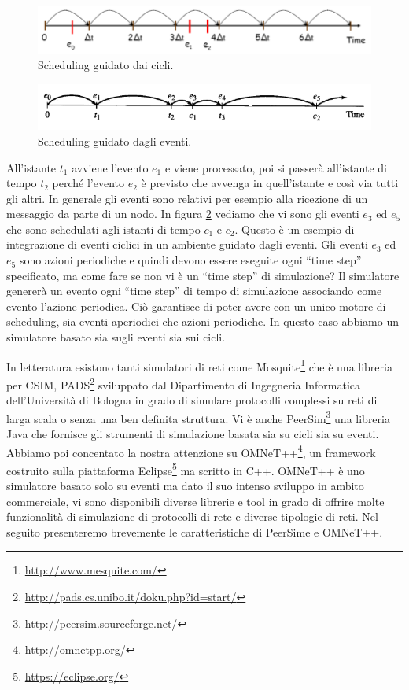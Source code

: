 \begin{figure}[t]
	\centering
	\includegraphics[width=0.9\linewidth, keepaspectratio]{Images/simulatori/cycled_driven_01}
	\caption[Cycle driven scheduling]{Scheduling guidato dai cicli.}
	\label{fig:cycled_driven_01}
\end{figure}

\begin{figure}[t]
	\centering
	\includegraphics[width=0.9\linewidth, keepaspectratio]{Images/simulatori/event_driven_01}
	\caption[Event driven scheduling]{Scheduling guidato dagli eventi.}
	\label{fig:event_driven_01}
\end{figure}

All'istante $t_1$ avviene l'evento $e_1$ e viene processato, poi si passerà all'istante di tempo $t_2$ perché l'evento $e_2$ è previsto che avvenga in quell'istante e così via tutti gli altri. In generale gli eventi sono relativi per esempio alla ricezione di un messaggio da parte di un nodo. In figura \ref{fig:event_driven_01} vediamo che vi sono gli eventi $e_3$ ed $e_5$ che sono schedulati agli istanti di tempo $c_1$ e $c_2$. Questo è un esempio di integrazione di eventi ciclici in un ambiente guidato dagli eventi. Gli eventi $e_3$ ed $e_5$ sono azioni periodiche e quindi devono essere eseguite ogni “time step” specificato, ma come fare se non vi è un “time step” di simulazione? Il simulatore genererà un evento ogni “time step” di tempo di simulazione associando come evento l'azione periodica. Ciò garantisce di poter avere con un unico motore di scheduling, sia eventi aperiodici che azioni periodiche. In questo caso abbiamo un simulatore basato sia sugli eventi sia sui cicli.

In letteratura esistono tanti simulatori di reti come Mosquite\footnote{\url{http://www.mesquite.com/}} che è una libreria per CSIM, PADS\footnote{\url{http://pads.cs.unibo.it/doku.php?id=start/}} sviluppato dal Dipartimento di Ingegneria Informatica dell'Università di Bologna in grado di simulare protocolli complessi su reti di larga scala o senza una ben definita struttura. Vi è anche PeerSim\footnote{\url{http://peersim.sourceforge.net/}} una libreria Java che fornisce gli strumenti di simulazione basata sia su cicli sia su eventi. Abbiamo poi concentato la nostra attenzione su OMNeT++\footnote{\url{http://omnetpp.org/}}, un framework costruito sulla piattaforma Eclipse\footnote{\url{https://eclipse.org/}} ma scritto in C++. OMNeT++ è uno simulatore basato solo su eventi ma dato il suo intenso sviluppo in ambito commerciale, vi sono disponibili diverse librerie e tool in grado di offrire molte funzionalità di simulazione di protocolli di rete e diverse tipologie di reti. Nel seguito presenteremo brevemente le caratteristiche di PeerSime e OMNeT++.

